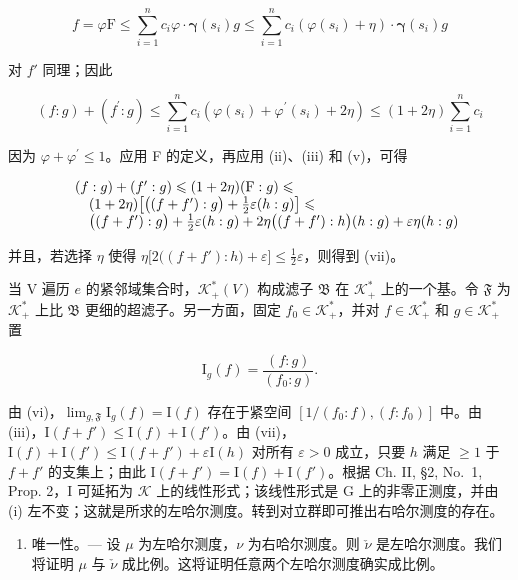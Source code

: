 \[
f = \varphi \mathrm{F} \leqslant \sum_ {i = 1} ^ {n} c _ {i} \varphi \cdot \boldsymbol {\gamma} (s _ {i}) g \leqslant \sum_ {i = 1} ^ {n} c _ {i} (\varphi (s _ {i}) + \eta) \cdot \boldsymbol {\gamma} (s _ {i}) g
\]

对 \(f'\) 同理；因此

\[
(f: g) + (f ^ {\prime}: g) \leqslant \sum_ {i = 1} ^ {n} c _ {i} (\varphi (s _ {i}) + \varphi^ {\prime} (s _ {i}) + 2 \eta) \leqslant (1 + 2 \eta) \sum_ {i = 1} ^ {n} c _ {i}
\]

因为 \(\varphi +\varphi^{\prime}\leqslant 1\)。应用 F 的定义，再应用 (ii)、(iii) 和 (v)，可得

\[
\begin{array}{r l} & {(f: g) + (f ^ {\prime}: g) \leqslant (1 + 2 \eta) (\mathrm{F}: g) \leqslant} \\ & {\quad (1 + 2 \eta) \big [ \big ((f + f ^ {\prime}): g \big) + \frac {1}{2} \varepsilon (h: g) \big ] \leqslant} \\ & {\quad \big ((f + f ^ {\prime}): g \big) + \frac {1}{2} \varepsilon (h: g) + 2 \eta \big ((f + f ^ {\prime}): h \big) (h: g) + \varepsilon \eta (h: g)} \end{array}
\]

并且，若选择 \(\eta\) 使得 \(\eta\big[2\big((f + f'):h\big) + \varepsilon\big] \leqslant \frac{1}{2}\varepsilon\)，则得到 (vii)。

当 V 遍历 \(e\) 的紧邻域集合时，\(\mathcal{K}_{+}^{*}(V)\) 构成滤子 \(\mathfrak{B}\) 在 \(\mathcal{K}_{+}^{*}\) 上的一个基。令 \(\mathfrak{F}\) 为 \(\mathcal{K}_{+}^{*}\) 上比 \(\mathfrak{B}\) 更细的超滤子。另一方面，固定 \(f_{0} \in \mathcal{K}_{+}^{*}\)，并对 \(f \in \mathcal{K}_{+}^{*}\) 和 \(g \in \mathcal{K}_{+}^{*}\) 置

\[
\mathrm{I} _ {g} (f) = \frac {(f : g)}{(f _ {0} : g)}.
\]

由 (vi)，\(\lim_{g,\mathfrak{F}}\mathrm{I}_g(f) = \mathrm{I}(f)\) 存在于紧空间 \([1 / (f_0:f),(f:f_0)]\) 中。由 (iii)，\(\mathrm{I}(f + f')\leqslant \mathrm{I}(f) + \mathrm{I}(f')\)。由 (vii)，\(\mathrm{I}(f) + \mathrm{I}(f')\leqslant \mathrm{I}(f + f') + \varepsilon \mathrm{I}(h)\) 对所有 \(\varepsilon >0\) 成立，只要 \(h\) 满足 \(\geqslant 1\) 于 \(f + f'\) 的支集上；由此 \(\mathrm{I}(f + f') = \mathrm{I}(f) + \mathrm{I}(f')\)。根据 Ch. II, §2, No.~1, Prop. 2，I 可延拓为 \(\mathcal{K}\) 上的线性形式；该线性形式是 G 上的非零正测度，并由 (i) 左不变；这就是所求的左哈尔测度。转到对立群即可推出右哈尔测度的存在。

\begin{enumerate}
\def\labelenumi{\Alph{enumi})}
\setcounter{enumi}{1}
\tightlist
\item
  唯一性。--- 设 \(\mu\) 为左哈尔测度，\(\nu\) 为右哈尔测度。则 \(\check{\nu}\) 是左哈尔测度。我们将证明 \(\mu\) 与 \(\check{\nu}\) 成比例。这将证明任意两个左哈尔测度确实成比例。
\end{enumerate}

